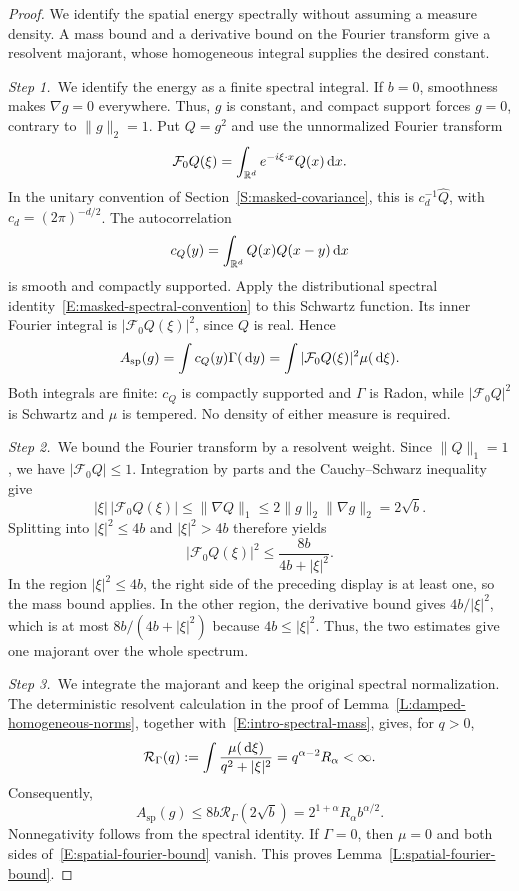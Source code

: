 \begin{proof}
  We identify the spatial energy spectrally without assuming a measure
  density. A mass bound and a derivative bound on the Fourier transform give a
  resolvent majorant, whose homogeneous integral supplies the desired
  constant.


  \medskip
  \noindent\textit{Step 1.~}We identify the energy as a finite spectral
  integral.
  If $b=0$, smoothness makes $\nabla g=0$ everywhere. Thus, $g$ is constant,
  and compact support forces $g=0$, contrary to $\|g\|_2=1$. Put $Q=g^2$ and
  use the unnormalized Fourier transform
  \[
    \mathcal{F}_0Q(\xi)=\int_{\mathbb{R}^d}e^{-i\xi\cdot x}Q(x)\,\mathrm{d} x.
  \]
  In the unitary convention of Section~\ref{S:masked-covariance}, this is
  $c_d^{-1}\widehat Q$, with $c_d=(2\pi)^{-d/2}$.
  The autocorrelation
  \[
    c_Q(y)=\int_{\mathbb{R}^d}Q(x)Q(x-y)\,\mathrm{d} x
  \]
  is smooth and compactly supported. Apply the distributional spectral
  identity~\eqref{E:masked-spectral-convention} to this Schwartz function.
  Its inner Fourier integral is $|\mathcal{F}_0Q(\xi)|^2$, since $Q$ is real.
  Hence
  \[
    A_{\mathrm{sp}}(g)=\int c_Q(y)\Gamma(\,\mathrm{d} y)
    =\int|\mathcal{F}_0Q(\xi)|^2\mu(\,\mathrm{d}\xi).
  \]
  Both integrals are finite: $c_Q$ is compactly supported and $\Gamma$ is
  Radon, while $|\mathcal{F}_0Q|^2$ is Schwartz and $\mu$ is tempered.
  No density of either measure is required.


  \medskip
  \noindent\textit{Step 2.~}We bound the Fourier transform by a resolvent
  weight.
  Since $\|Q\|_1=1$, we have $|\mathcal{F}_0Q|\le1$. Integration by parts
  and the Cauchy--Schwarz inequality give
  \[
    |\xi|\,|\mathcal{F}_0Q(\xi)|
    \le\|\nabla Q\|_1
    \le2\|g\|_2\|\nabla g\|_2=2\sqrt b.
  \]
  Splitting into $|\xi|^2\le4b$ and $|\xi|^2>4b$ therefore yields
  \[
    |\mathcal{F}_0Q(\xi)|^2\le\frac{8b}{4b+|\xi|^2}.
  \]
  In the region $|\xi|^2\le4b$, the right side of the preceding display is at
  least one, so the mass bound applies. In the other region, the derivative
  bound gives $4b/|\xi|^2$, which is at most $8b/(4b+|\xi|^2)$ because
  $4b\le|\xi|^2$. Thus, the two estimates give one majorant over the whole
  spectrum.

  \medskip
  \noindent\textit{Step 3.~}We integrate the majorant and keep the original
  spectral normalization.
  The deterministic resolvent calculation in the proof of
  Lemma~\ref{L:damped-homogeneous-norms}, together
  with~\eqref{E:intro-spectral-mass}, gives, for $q>0$,
  \[
    \mathcal{R}_\Gamma(q):=\int\frac{\mu(\,\mathrm{d}\xi)}{q^2+|\xi|^2}
    =q^{\alpha-2}R_\alpha<\infty.
  \]
  Consequently,
  \[
    A_{\mathrm{sp}}(g)\le8b\mathcal{R}_\Gamma(2\sqrt b)
    =2^{1+\alpha}R_\alpha b^{\alpha/2}.
  \]
  Nonnegativity follows from the spectral identity. If $\Gamma=0$, then
  $\mu=0$ and both sides of~\eqref{E:spatial-fourier-bound} vanish. This proves
  Lemma~\ref{L:spatial-fourier-bound}.
\end{proof}

